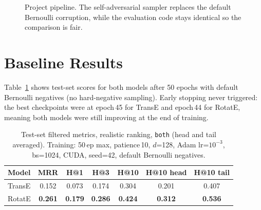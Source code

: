 \documentclass{llncs}
\begin{document}
\begin{figure}[t]
\centering
{}
\caption{Project pipeline. The self-adversarial sampler replaces
the default Bernoulli corruption, while the evaluation code stays
identical so the comparison is fair.}
\label{fig:pipeline}
\end{figure}

\section{Baseline Results}

Table~\ref{tab:baseline} shows test-set scores for both models after
50 epochs with default Bernoulli negatives (no hard-negative sampling).
Early stopping never triggered: the best checkpoints were at epoch\,45
for TransE and epoch\,44 for RotatE, meaning both models were still
improving at the end of training.

\begin{table}[t]
\centering
\caption{Test-set filtered metrics, realistic ranking, \texttt{both}
  (head and tail averaged).
  Training: 50\,ep max, patience\,10, $d$=128,
  Adam lr=$10^{-3}$, bs=1024, CUDA, seed=42, default Bernoulli negatives.}
\label{tab:baseline}
\begin{tabular}{@{}lcccccc@{}}
\toprule
Model   & MRR   & H@1   & H@3   & H@10  & H@10 head & H@10 tail \\
\midrule
TransE  & 0.152 & 0.073 & 0.174 & 0.304 & 0.201 & 0.407 \\
RotatE  & \textbf{0.261} & \textbf{0.179} & \textbf{0.286} &
          \textbf{0.424} & \textbf{0.312} & \textbf{0.536} \\
\bottomrule
\end{tabular}
\end{table}
\end{document}
